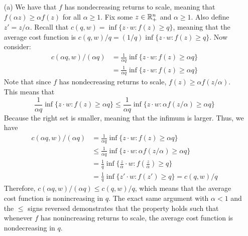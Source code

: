 \documentclass[12pt]{article}
\begin{document}
\begin{itemize}
    \item[(a)] We have that $f$ has nondecreasing returns to scale, meaning that $f(\alpha z) \ge \alpha f(z)$ for all $\alpha \ge 1$. Fix some $z \in \mathbb{R}^n_+$ and $\alpha \ge 1$. Also define $z' = z / \alpha$. Recall that $c(q,w) = \inf\{z \cdot w : f(z) \ge q\}$, meaning that the average cost function is $c(q,w)/q = (1/q) \inf\{z \cdot w : f(z) \ge q\}$. Now consider:
    \begin{align*}
    c(\alpha q , w) / (\alpha q) &= \frac{1}{\alpha q} \inf\{z \cdot w : f(z) \ge \alpha q\} \\
    &= \frac{1}{\alpha q} \inf\{z \cdot w : f(z) \ge \alpha q\} 
    \end{align*}
    Note that since $f$ has nondecreasing returns to scale, $f(z) \ge \alpha f(z/\alpha)$. This means that 
    \[
     \frac{1}{\alpha q} \inf\{z \cdot w : f(z) \ge \alpha q\}  \le \frac{1}{\alpha q} \inf\{z \cdot w : \alpha f(z/\alpha) \ge \alpha q\} 
    \]
    Because the right set is smaller, meaning that the infimum is larger. Thus, we have
    \begin{align*}
        c(\alpha q , w) / (\alpha q) &= \frac{1}{\alpha q} \inf\{z \cdot w : f(z) \ge \alpha q\} \\
        &\le  \frac{1}{\alpha q} \inf\{z \cdot w : \alpha f(z/\alpha) \ge \alpha q\} \\
        &= \frac{1}{q}\inf\{\frac{z}{\alpha} \cdot w : f(\frac{z}{\alpha}) \ge q\} \\
        &= \frac{1}{q}\inf\{z' \cdot w : f(z') \ge q\} = c(q,w) / q
    \end{align*}
    Therefore, $c(\alpha q , w) / (\alpha q) \le c(q,w)/q$, which means that the average cost function is nonincreasing in $q$. The exact same argument with $\alpha < 1$ and the $\le$ signs reversed demonstrates that the property holds such that whenever $f$ has nonincreasing returns to scale, the average cost function is nondecreasing in $q$.


\end{itemize}
\end{document}
